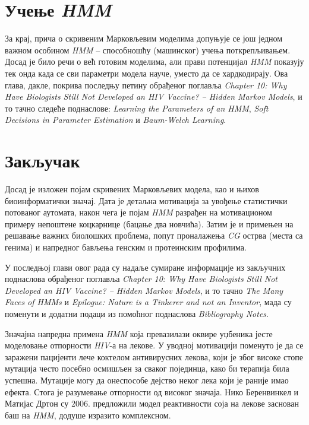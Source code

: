 \documentclass[12pt,oneside]{memoir}
\begin{document}
\begin{CJK}{UTF8}{ipxm}
\chapter{Учење \textit{HMM}}
За крај, прича о скривеним Марковљевим моделима допуњује се још једном важном особином \textit{HMM} -- способношћу (машинског) учења поткрепљивањем. Досад је било речи о већ готовим моделима, али прави потенцијал \textit{HMM} показују тек онда када се сви параметри модела науче, уместо да се хардкодирају. Ова глава, дакле, покрива последњу петину обрађеног поглавља \textit{Chapter 10: Why Have Biologists Still Not Developed an HIV Vaccine? -- Hidden Markov Models}, и то тачно следеће поднаслове: \textit{Learning the Parameters of an HMM}, \textit{Soft Decisions in Parameter Estimation} и \textit{Baum-Welch Learning}.

\chapter{Закључак}
Досад је изложен појам скривених Марковљевих модела, као и њихов биоинформатички значај. Дата је детаљна мотивација за увођење статистички потованог аутомата, након чега је појам \textit{HMM} разрађен на мотивационом примеру непоштене коцкарнице (бацање два новчића). Затим је и примењен на решавање важних биолошких проблема, попут проналажења \textit{CG} острва (места са генима) и напредног бављења генским и протеинским профилима.

У последњој глави овог рада су надаље сумиране информације из закључних поднаслова обрађеног поглавља \textit{Chapter 10: Why Have Biologists Still Not Developed an HIV Vaccine? -- Hidden Markov Models}, и то тачно \textit{The Many Faces of HMMs} и \textit{Epilogue: Nature is a Tinkerer and not an Inventor}, мада су поменути и додатни подаци из помоћног поднаслова \textit{Bibliography Notes}.

Значајна напредна примена \textit{HMM} која превазилази оквире уџбеника јесте моделовање отпорности \textit{HIV}-а на лекове. У уводној мотивацији поменуто је да се заражени пацијенти лече коктелом антивирусних лекова, који је због високе стопе мутација често посебно осмишљен за сваког појединца, како би терапија била успешна. Мутације могу да онеспособе дејство неког лека који је раније имао ефекта. Стога је разумевање отпорности од високог значаја. Нико Беренвинкел и Матијас Дртон су 2006. предложили модел реактивности соја на лекове заснован баш на \textit{HMM}, додуше изразито комплексном\cite{beerenwinkel2007}.


\end{CJK}
\end{document}
